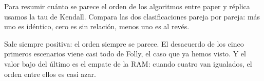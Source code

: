 Para resumir cuánto se parece el orden de los algoritmos entre paper y réplica usamos la tau de Kendall. Compara las dos clasificaciones pareja por pareja: más uno es idéntico, cero es sin relación, menos uno es al revés.

Sale siempre positiva: el orden siempre se parece. El desacuerdo de los cinco primeros escenarios viene casi todo de Folly, el caso que ya hemos visto. Y el valor bajo del último es el empate de la RAM: cuando cuatro van igualados, el orden entre ellos es casi azar.
